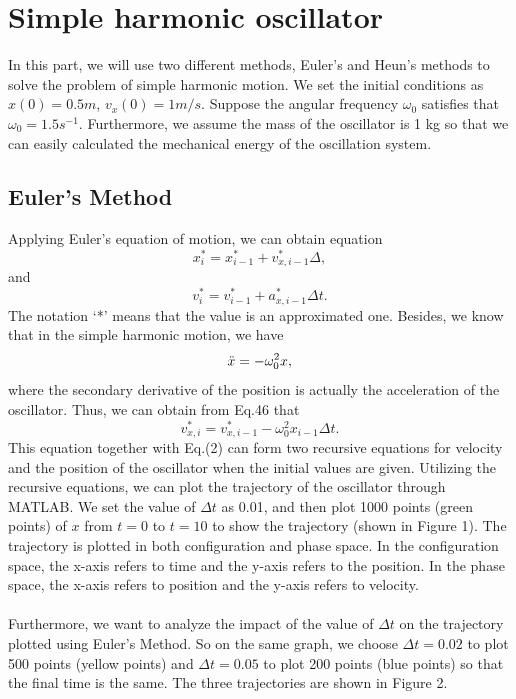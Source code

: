 \documentclass[12pt]{report}
\begin{document}
\section{Simple harmonic oscillator}
In this part, we will use two different methods, Euler's and Heun's methods to solve the problem of simple harmonic motion. We set the initial conditions as $x(0)=0.5 m$, $v_{x}(0)=1m/s$. Suppose the angular frequency $\omega_{0}$ satisfies that $\omega_{0}=1.5 s^{-1}$. Furthermore, we assume the mass of the oscillator is 1 kg so that we can easily calculated the mechanical energy of the oscillation system.
\subsection{Euler's Method}
Applying Euler's equation of motion, we can obtain equation
\begin{equation}
	x_{i}^*=x_{i-1}^*+v_{x,i-1}^*\Delta, 
\end{equation}
and
\begin{equation}
	v_{i}^*=v_{i-1}^*+a_{x,i-1}^*\Delta t.
\end{equation}
The notation `*' means that the value is an approximated one. Besides, we know that in the simple harmonic motion, we have
\begin{equation}
    \Ddot{x}=-\omega_{0}^2x,
\end{equation}
where the secondary derivative of the position is actually the acceleration of the oscillator. Thus, we can obtain from Eq.46 that
\begin{equation}
    v_{x,i}^*=v_{x,i-1}^*-\omega_{0}^2x_{i-1}\Delta t.
\end{equation}
This equation together with Eq.(2) can form two recursive equations for velocity and the position of the oscillator when the initial values are given. Utilizing the recursive equations, we can plot the trajectory of the oscillator through MATLAB.
We set the value of $\Delta t$ as 0.01, and then plot 1000 points (green points) of $x$ from $t=0$ to $t=10$ to show the trajectory (shown in Figure 1). The trajectory is plotted in both configuration and phase space. In the configuration space, the x-axis refers to time and the y-axis refers to the position. In the phase space, the x-axis refers to position and the y-axis refers to velocity.\\~\\
Furthermore, we want to analyze the impact of the value of $\Delta t$ on the trajectory plotted using Euler's Method. So on the same graph, we choose $\Delta t=0.02$ to plot 500 points (yellow points) and $\Delta t=0.05$ to plot 200 points (blue points) so that the final time is the same. The three trajectories are shown in Figure 2.\\
\end{document}
